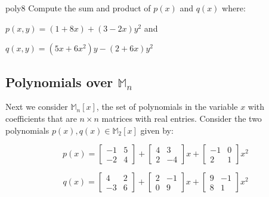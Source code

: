 \begin{exercise}{poly8}
Compute the sum and product of $p(x)$ and $q(x)$ where:

$p(x,y)=  (1+8x)+(3-2x)y^2$ and

$q(x,y)= (5x+6x^2)y-(2+6x)y^2$



\end{exercise}

\subsection*{Polynomials over $\mathbb{M}_n$}
Next we consider $\mathbb{M}_n[x]$, the set of polynomials in the variable $x$ with coefficients that are  $n{\times}n$ matrices with real entries. Consider the two polynomials $p(x), q(x) \in \mathbb{M}_2[x]$ given by:

$$p(x)=  \begin{bmatrix} 
-1 & 5  \\
-2 & 4 
\end{bmatrix}
+\begin{bmatrix} 
4 & 3 \\
2 & -4 
\end{bmatrix}
 x+\begin{bmatrix} 
-1 & 0 \\
2 & 1 
\end{bmatrix}
 x^2$$

$$q(x)=  \begin{bmatrix} 
4 & 2 \\
-3 & 6
\end{bmatrix}
+\begin{bmatrix} 
2 & -1 \\
0 & 9 
\end{bmatrix}
 x+\begin{bmatrix} 
9 & -1 \\
8 & 1 
\end{bmatrix}
 x^2$$


